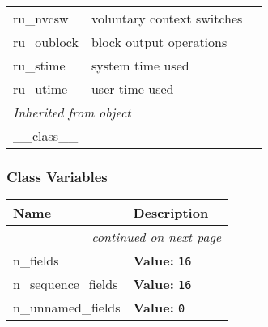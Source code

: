 \begin{longtable}{|p{\varnamewidth}|p{\vardescrwidth}|l}
\raggedright r\-u\-\_\-n\-v\-c\-s\-w\- & \raggedright voluntary context switches&\\
\cline{1-2}
\raggedright r\-u\-\_\-o\-u\-b\-l\-o\-c\-k\- & \raggedright block output operations&\\
\cline{1-2}
\raggedright r\-u\-\_\-s\-t\-i\-m\-e\- & \raggedright system time used&\\
\cline{1-2}
\raggedright r\-u\-\_\-u\-t\-i\-m\-e\- & \raggedright user time used&\\
\cline{1-2}
\multicolumn{2}{|l|}{\textit{Inherited from object}}\\
\multicolumn{2}{|p{\varwidth}|}{\raggedright \_\_class\_\_}\\
\cline{1-2}
\end{longtable}



  \subsubsection{Class Variables}

    \vspace{-1cm}
\hspace{\varindent}\begin{longtable}{|p{\varnamewidth}|p{\vardescrwidth}|l}
\cline{1-2}
\cline{1-2} \centering \textbf{Name} & \centering \textbf{Description}& \\
\cline{1-2}
\endhead\cline{1-2}\multicolumn{3}{r}{\small\textit{continued on next page}}\\\endfoot\cline{1-2}
\endlastfoot\raggedright n\-\_\-f\-i\-e\-l\-d\-s\- & \raggedright \textbf{Value:} 
{\tt 16}&\\
\cline{1-2}
\raggedright n\-\_\-s\-e\-q\-u\-e\-n\-c\-e\-\_\-f\-i\-e\-l\-d\-s\- & \raggedright \textbf{Value:} 
{\tt 16}&\\
\cline{1-2}
\raggedright n\-\_\-u\-n\-n\-a\-m\-e\-d\-\_\-f\-i\-e\-l\-d\-s\- & \raggedright \textbf{Value:} 
{\tt 0}&\\
\cline{1-2}
\end{longtable}

